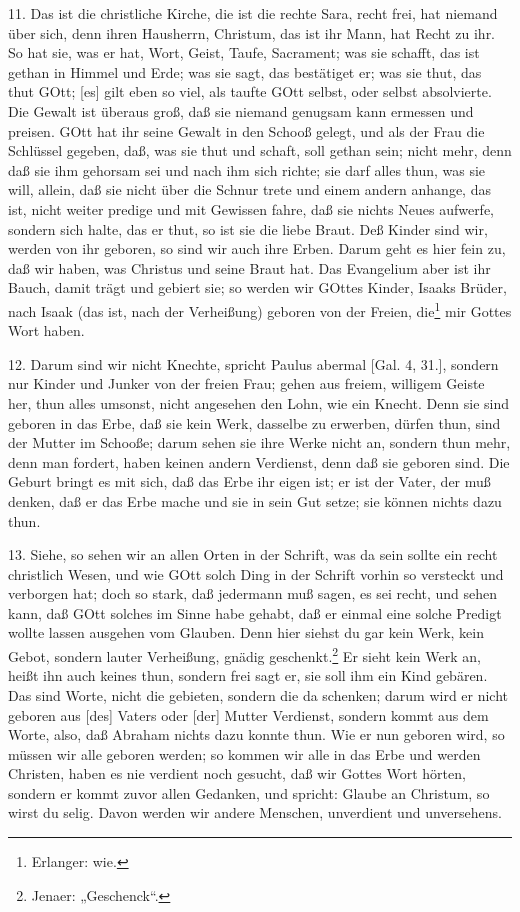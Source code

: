 11. Das ist die christliche Kirche, die ist die rechte Sara, recht frei, hat niemand über sich, denn ihren Hausherrn, Christum, das ist ihr Mann, hat Recht zu ihr. So hat sie, was er hat, Wort, Geist, Taufe, Sacrament; was sie schafft, das ist gethan in Himmel und Erde; was sie sagt, das bestätiget er; was sie thut, das thut GOtt; [es] gilt eben so viel, als taufte GOtt selbst, oder selbst absolvierte. Die Gewalt ist überaus groß, daß sie niemand genugsam kann ermessen und preisen. GOtt hat ihr seine Gewalt in den Schooß gelegt, und als der Frau die Schlüssel gegeben, daß, was sie thut und
schaft, soll gethan sein; nicht mehr, denn daß sie ihm gehorsam sei und nach ihm sich richte; sie darf alles thun, was sie will, allein, daß sie nicht über die Schnur trete und einem andern anhange, das ist, nicht weiter predige und mit Gewissen fahre, daß sie nichts Neues aufwerfe, sondern sich halte, das er thut, so ist sie die liebe Braut. Deß Kinder sind wir, werden von ihr geboren, so sind wir auch ihre Erben. Darum geht es hier fein zu, daß wir haben, was Christus und seine Braut hat. Das Evangelium aber ist ihr Bauch, damit trägt und gebiert sie; so werden wir GOttes Kinder, Isaaks Brüder, nach Isaak (das ist, nach der Verheißung) geboren von der Freien, die\footnote{Erlanger: wie.} mir Gottes Wort haben.

12. Darum sind wir nicht Knechte, spricht Paulus abermal [Gal. 4, 31.], sondern nur Kinder und Junker von der freien Frau; gehen aus freiem, willigem Geiste her, thun alles umsonst, nicht angesehen den Lohn, wie ein Knecht. Denn sie sind geboren in das Erbe, daß sie kein Werk, dasselbe zu erwerben, dürfen thun, sind der Mutter im Schooße; darum sehen sie ihre Werke nicht an, sondern thun mehr, denn man fordert, haben keinen andern Verdienst, denn daß sie geboren sind. Die Geburt bringt es mit sich, daß das Erbe ihr eigen ist; er ist der Vater, der muß denken, daß er das Erbe mache und sie in sein Gut setze; sie können nichts dazu thun.

13. Siehe, so sehen wir an allen Orten in der Schrift, was da sein sollte ein recht christlich Wesen, und wie GOtt solch Ding in der Schrift vorhin so versteckt und verborgen hat; doch so stark, daß jedermann muß sagen, es sei recht, und sehen kann, daß GOtt solches im Sinne habe gehabt, daß er einmal eine solche Predigt wollte lassen ausgehen vom Glauben. Denn hier siehst du gar kein Werk, kein Gebot, sondern lauter Verheißung, gnädig geschenkt.\footnote{Jenaer: „Geschenck“.} Er sieht kein Werk an, heißt ihn auch keines thun, sondern frei sagt er, sie soll ihm ein Kind gebären. Das sind Worte, nicht die gebieten, sondern die da schenken; darum wird er nicht geboren aus [des] Vaters oder [der] Mutter Verdienst, sondern kommt aus dem Worte, also, daß Abraham nichts dazu konnte thun. Wie er nun geboren wird, so müssen wir alle geboren werden; so kommen wir alle in das Erbe und werden Christen, haben es nie verdient noch gesucht, daß wir Gottes Wort hörten, sondern er kommt zuvor allen Gedanken, und spricht: Glaube an Christum, so wirst du selig. Davon werden wir andere Menschen, unverdient und unversehens.

